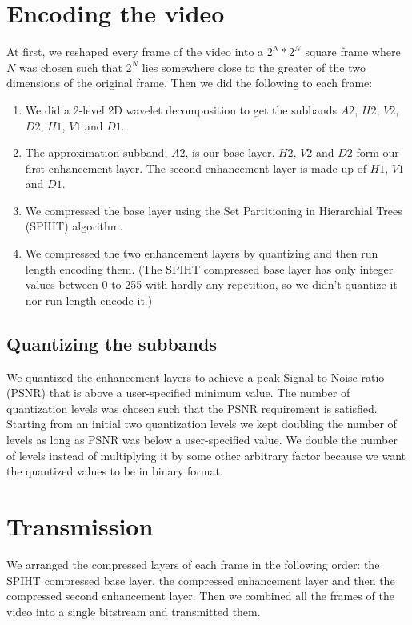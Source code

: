 \documentclass[10pt,twocolumn]{article}
\begin{document}
\section{Encoding the video}

At first, we reshaped every frame of the video into a $2^N * 2^N$ square frame where $N$ was chosen such that $2^N$ lies somewhere close to the greater of the two dimensions of the original frame.
Then we did the following to each frame:
\begin{enumerate}
    \item We did a 2-level 2D wavelet decomposition to get the subbands $A2$, $H2$, $V2$, $D2$, $H1$, $V1$ and $D1$.
    \item The approximation subband, $A2$, is our base layer. $H2$, $V2$ and $D2$ form our first enhancement layer. The second enhancement layer is made up of $H1$, $V1$ and $D1$.
    \item We compressed the base layer using the Set Partitioning in Hierarchial Trees (SPIHT) algorithm\cite{amirSaid1996}.
    \item We compressed the two enhancement layers by quantizing and then run length encoding them. (The SPIHT compressed base layer has only integer values between 0 to 255 with hardly any repetition, so we didn't quantize it nor run length encode it.)
\end{enumerate}

\subsection*{Quantizing the subbands}

We quantized the enhancement layers to achieve a peak Signal-to-Noise ratio (PSNR) that is above a user-specified minimum value. The number of quantization levels was chosen such that the PSNR requirement is satisfied. Starting from an initial two quantization levels we kept  doubling the number of levels as long as PSNR was below a user-specified value. We double the number of levels instead of multiplying it by some other arbitrary factor because we want the quantized values to be in binary format.

\section{Transmission}

We arranged the compressed layers of each frame in the following order: the SPIHT compressed base layer, the compressed enhancement layer and then the compressed second enhancement layer.
Then we combined all the frames of the video into a single bitstream and transmitted them.
\end{document}
